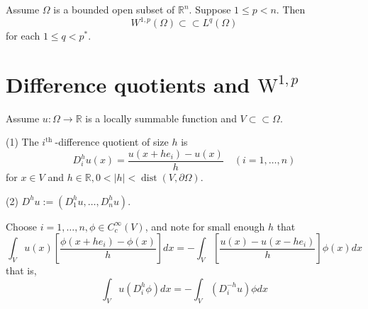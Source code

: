 \begin{theorem}
    Assume \( \Omega \) is a bounded open subset of \( \mathbb{R}^n \). Suppose \( 1 \leq p < n \). Then
    \begin{equation*}
        W^{1,p}\left(\Omega\right) \subset \subset L^q\left(\Omega\right)
    \end{equation*}
    for each \( 1 \leq q < p^* \).
\end{theorem}











\section{Difference quotients and \texorpdfstring{$\mathrm{W}^{1, p}$}{}}


\begin{definition}
    Assume $u: \Omega \rightarrow \mathbb{R}$ is a locally summable function and $V \subset \subset \Omega$.

    (1) The $i^{\text {th }}$-difference quotient of size $h$ is
    \begin{equation*}
        D_i^h u(x)=\frac{u\left(x+h e_i\right)-u(x)}{h} \quad(i=1, \ldots, n)
    \end{equation*}
    for $x \in V$ and $h \in \mathbb{R}, 0<|h|<\operatorname{dist}(V, \partial \Omega)$.

    (2) $D^h u:=\left(D_1^h u, \ldots, D_n^h u\right)$.

\end{definition}

\begin{proposition}
    Choose $i=1, \ldots, n, \phi \in C_c^{\infty}(V)$, and note for small enough $h$ that
    \begin{equation*}
        \int_V u(x)\left[\frac{\phi\left(x+h e_i\right)-\phi(x)}{h}\right] d x=-\int_V\left[\frac{u(x)-u\left(x-h e_i\right)}{h}\right] \phi(x) d x
    \end{equation*}
    that is,
    \begin{equation*}
        \int_V u\left(D_i^h \phi\right) d x=-\int_V\left(D_i^{-h} u\right) \phi d x
    \end{equation*}
\end{proposition}

